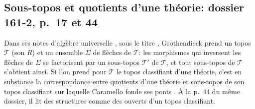 \subsection{Sous-topos et quotients d'une théorie: dossier 161-2, p.~17 et 44}

Dans ses notes d'algèbre universelle \cite[p.~17]{grothendieck-161-2}, sous le titre , Grothendieck prend un topos $\mathcal T$ (son $R$) et un ensemble $\Sigma$ de flèches de $\mathcal T$: les morphismes qui inversent les flèches de $\Sigma$ se factorisent par un sous-topos $\mathcal T'$ de $\mathcal T$, et tout sous-topos de $\mathcal T$ s'obtient ainsi. Si l'on prend pour $\mathcal T$ le topos classifiant d'une théorie, c'est en substance la correspondance entre quotients d'une théorie et sous-topos de son topos classifiant sur laquelle Caramello fonde ses ponts \cite{caramello-tst}. À la p.~44 du même dossier, il lit des structures comme des ouverts d'un topos classifiant.
